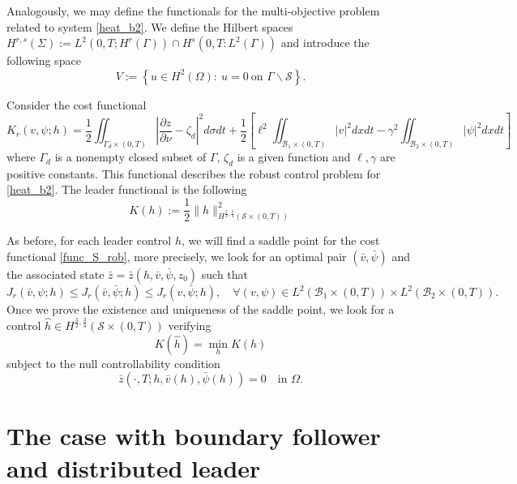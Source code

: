 \documentclass[preprint,10pt]{article}
\numberwithin{equation}{section}
\numberwithin{theorem}{section}
\begin{document}
{Analogously, we may define the functionals for the multi-objective problem related to system \eqref{heat_b2}. We define the Hilbert spaces $H^{r,s}(\Sigma):=L^2(0,T;H^r(\Gamma))\cap H^s(0,T:L^2(\Gamma))$ and introduce the following space
%
\begin{equation}
V:=\left\{u\in H^2(\Omega): \  u=0 \ \text{on } \Gamma\backslash \mathcal S\right\}.
\end{equation}

Consider the cost functional 
%
\begin{equation}\label{func_S_rob}
K_r(v,\psi;h)=\frac{1}{2}\iint_{\Gamma_d\times(0,T)}\left|\frac{\partial z}{\partial \nu}-\zeta_d\right|^2d\sigma dt+\frac{1}{2}\left[\ell^2\iint_{\mathcal B_1\times(0,T)}|v|^2dxdt-\gamma^2\iint_{\mathcal B_2\times(0,T)}|\psi|^2dxdt\right]
\end{equation}
%
where $\Gamma_d$ is a nonempty closed subset of $\Gamma$, $\zeta_d$ is a given function and $\ell,\gamma$ are positive constants. This functional describes the robust control problem for \eqref{heat_b2}. The leader functional is the following
%
\begin{equation}
K(h):=\frac{1}{2}\|h\|^2_{H^{\frac{3}{2},\frac{3}{4}}(\mathcal S\times(0,T))}
\end{equation}
%

As before, for each leader control $h$, we will find a saddle point for the cost functional \eqref{func_S_rob}, more precisely, 
we look for an optimal pair $(\bar v,\bar \psi)$ and the associated state $\bar z=\bar z(h,\bar v,\bar \psi, z_0)$ such that 
%
\begin{equation}\label{saddle_2}
J_r(\bar v,\psi;h)\leq J_r(\bar v,\bar \psi;h)\leq J_r(v,\bar \psi;h), \quad \forall (v,\psi)\in L^2(\mathcal B_1\times(0,T))\times L^2(\mathcal B_2\times(0,T)).
\end{equation}
%
Once we prove the existence and uniqueness of the saddle point, we look for a control $\hat h\in H^{\frac{3}{2},\frac{3}{4}}(\mathcal S\times(0,T))$ verifying 
%
\begin{equation}
K(\hat h)=\min_{h} K(h)
\end{equation}
%
subject to the null controllability condition
%
\begin{equation}
\bar z(\cdot,T; h,\bar v(h), \bar \psi(h))=0 \quad \text{in } \Omega.
\end{equation}
%

\section{The case with boundary follower and distributed leader}

}
\end{document}
